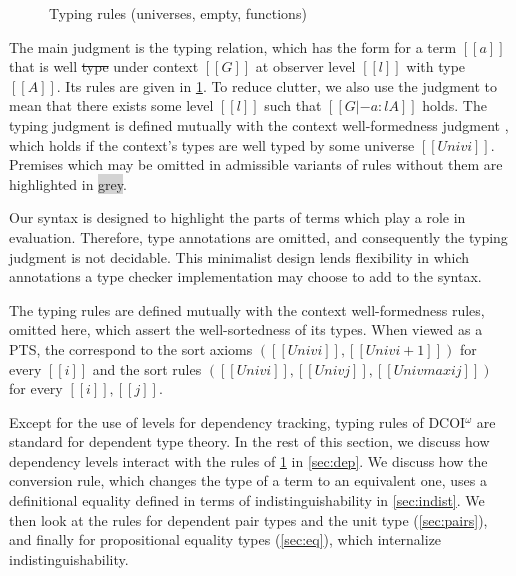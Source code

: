 \documentclass[acmsmall, screen=true, nonacm=true,
  review=\ifpublic false\else true\fi,
  anonymous=\ifanonymous true\else false\fi
]{acmart}
\makeatletter
\newcommand{\sw}[1]{}
\newcommand{\name}{\texorpdfstring{DCOI$^{\omega}$\@\xspace}{DCOI-omega}}
\newcommand{\judgement}[1]{{\setlength{\fboxsep}{1.5pt}\fbox{#1}}}
\providecommand{\DIFadd}[1]{{\protect\color{blue}\uwave{#1}}} %
\providecommand{\DIFdel}[1]{{\protect\color{red}\sout{#1}}}                      %
\providecommand{\DIFaddbegin}{} %
\providecommand{\DIFaddend}{} %
\providecommand{\DIFdelbegin}{} %
\providecommand{\DIFdelend}{} %
\makeatother
\begin{document}
\begin{figure}[h]
  \caption{Typing rules (universes, empty, functions)}
  \Description{}
  \label{fig:typing:dep}
\end{figure}

The main judgment is the typing relation,
which has the form \judgement{$[[G |- a : l A]]$} for a term $[[a]]$
that is well \DIFdelbegin \DIFdel{type }\DIFdelend \DIFaddbegin \DIFadd{typed }\DIFaddend under context $[[G]]$ at observer level $[[l]]$
with type $[[A]]$.
Its rules are given in \cref{fig:typing:dep}.
To reduce clutter,
we also use the judgment \judgement{$[[G |- a : A]]$} to mean that there exists some level $[[l]]$
such that $[[G |- a : l A]]$ holds.
The typing judgment is defined mutually with the context well-formedness judgment \judgement{$[[|- G]]$},
which holds if the context's types are well typed by some universe $[[Univ i]]$.
Premises which may be omitted in admissible variants of rules without them
are highlighted in \colorbox{lightgray}{grey}.

Our syntax is designed to highlight the parts of terms which play a role in evaluation.
Therefore, type annotations are omitted,
and consequently the typing judgment is not decidable.
This minimalist design lends flexibility in which annotations
a type checker implementation may choose to add to the syntax.

\sw{We need to say up front that this typing judgment is not designed to be decidable as the
  syntax does not include enough annotations. We design it this way to highlight the relevant parts of
the terms. We also have flexibility in where we add annotations, none or relevant so we can add as many or as few as we need depending on how sophisticated we would like the type checking algorithm to be.}

The typing rules are defined mutually with the context well-formedness rules,
omitted here, which assert the well-sortedness of its types.
When viewed as a PTS, the  correspond
to the sort axioms $([[Univ i]], [[Univ i + 1]])$ for every $[[i]]$
and the sort rules $([[Univ i]], [[Univ j]], [[Univ max i j]])$ for every $[[i]], [[j]]$.

Except for the use of levels for dependency tracking, typing rules of \name
are standard for dependent type theory. In the rest of this section, we
discuss how dependency levels interact with the rules of \cref{fig:typing:dep}
in \cref{sec:dep}. We discuss how the conversion rule, which changes the type of a term to an equivalent one,
uses a definitional equality defined in terms of indistinguishability in \cref{sec:indist}.
We then look at the rules for dependent pair types and the unit type (\cref{sec:pairs}),
and finally for propositional equality types (\cref{sec:eq}),
which internalize indistinguishability.
\end{document}
